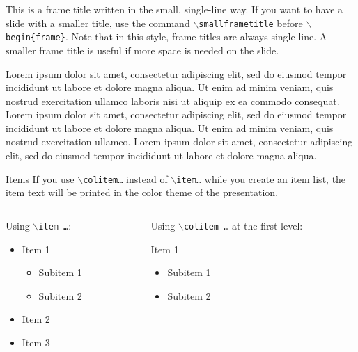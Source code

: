 \documentclass[
	] {beamer}
\begin{document}
\smallframetitle %
\begin{frame}{This is a frame title written in the small, single-line way.}
	If you want to have a slide with a smaller title, use the command \texttt{$\backslash$smallframetitle} before \texttt{$\backslash$begin\{frame\}}. Note that in this
	style, frame titles are always single-line. A smaller frame title is useful if more space is needed on the slide.

	Lorem ipsum dolor sit amet, consectetur adipiscing elit, sed do eiusmod tempor
	incididunt ut labore et dolore magna aliqua. Ut enim ad minim veniam, quis
	nostrud exercitation ullamco laboris nisi ut aliquip ex ea commodo consequat.
	Lorem ipsum dolor sit amet, consectetur adipiscing elit, sed do eiusmod tempor 
	incididunt ut labore et dolore magna aliqua. Ut enim ad minim veniam, quis 
	nostrud exercitation ullamco. Lorem ipsum dolor sit amet, consectetur adipiscing
	elit, sed do eiusmod tempor  incididunt ut labore et dolore magna aliqua.
\end{frame}



\normalframetitle
\begin{frame}{Items}
	If you use  \texttt{$\backslash$colitem\ldots} instead of
	\texttt{$\backslash$item\ldots} while you create an item list, the item text
	will be printed in the color theme of the presentation.

	\vfill
	\begin{columns}
		\begin{column}{.45\linewidth}
			Using \texttt{$\backslash$item \ldots}:
			\begin{itemize}
				\item Item 1
					\begin{itemize}
						\item Subitem 1
						\item Subitem 2
					\end{itemize}
				\item Item 2
				\item Item 3
			\end{itemize}
		\end{column}
		\begin{column}{.45\linewidth}
			Using \texttt{$\backslash$colitem \ldots } at the first level:
			\begin{itemize}
				\colitem Item 1
					\begin{itemize}
						\item Subitem 1
						\item Subitem 2
					\end{itemize}
			\end{itemize}
		\end{column}
	\end{columns}
\end{frame}
\end{document}
